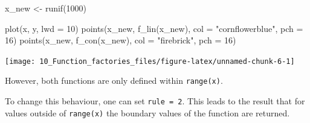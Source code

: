 \documentclass[
]{krantz}
\makeatletter
\newenvironment{Shaded}{\begin{snugshade}}{\end{snugshade}}
\newcommand{\CommentTok}[1]{\textcolor[rgb]{0.56,0.35,0.01}{\textit{#1}}}
\newcommand{\DataTypeTok}[1]{\textcolor[rgb]{0.13,0.29,0.53}{#1}}
\newcommand{\DecValTok}[1]{\textcolor[rgb]{0.00,0.00,0.81}{#1}}
\newcommand{\KeywordTok}[1]{\textcolor[rgb]{0.13,0.29,0.53}{\textbf{#1}}}
\newcommand{\NormalTok}[1]{#1}
\newcommand{\OperatorTok}[1]{\textcolor[rgb]{0.81,0.36,0.00}{\textbf{#1}}}
\newcommand{\StringTok}[1]{\textcolor[rgb]{0.31,0.60,0.02}{#1}}
\newenvironment{kframe}{%
\medskip{}
\setlength{\fboxsep}{.8em}
 \def\at@end@of@kframe{}%
 \ifinner\ifhmode%
  \def\at@end@of@kframe{\end{minipage}}%
  \begin{minipage}{\columnwidth}%
 \fi\fi%
 \def\FrameCommand##1{\hskip\@totalleftmargin \hskip-\fboxsep
 \colorbox{shadecolor}{##1}\hskip-\fboxsep
     \hskip-\linewidth \hskip-\@totalleftmargin \hskip\columnwidth}%
 \MakeFramed {\advance\hsize-\width
   \@totalleftmargin\z@ \linewidth\hsize
   \@setminipage}}%
 {\par\unskip\endMakeFramed%
 \at@end@of@kframe}
\renewenvironment{Shaded}{\begin{kframe}}{\end{kframe}}
\renewcommand{\KeywordTok} [1]{\textcolor[rgb]{0.00,0.44,0.13}{{#1}}}
\renewcommand{\DataTypeTok}[1]{\textcolor[rgb]{0.56,0.13,0.00}{{#1}}}
\renewcommand{\DecValTok}  [1]{\textcolor[rgb]{0.25,0.63,0.44}{{#1}}}
\renewcommand{\StringTok}  [1]{\textcolor[rgb]{0.25,0.44,0.63}{{#1}}}
\renewcommand{\CommentTok} [1]{\textcolor[rgb]{0.38,0.63,0.69}{{#1}}}
\renewcommand{\NormalTok}  [1]{{#1}}
\makeatother
\begin{document}
\begin{Shaded}
\begin{Highlighting}[]
\NormalTok{x_new <-}\StringTok{ }\KeywordTok{runif}\NormalTok{(}\DecValTok{1000}\NormalTok{)}

\KeywordTok{plot}\NormalTok{(x, y, }\DataTypeTok{lwd =} \DecValTok{10}\NormalTok{)}
\KeywordTok{points}\NormalTok{(x_new, }\KeywordTok{f_lin}\NormalTok{(x_new), }\DataTypeTok{col =} \StringTok{"cornflowerblue"}\NormalTok{, }\DataTypeTok{pch =} \DecValTok{16}\NormalTok{)}
\KeywordTok{points}\NormalTok{(x_new, }\KeywordTok{f_con}\NormalTok{(x_new), }\DataTypeTok{col =} \StringTok{"firebrick"}\NormalTok{, }\DataTypeTok{pch =} \DecValTok{16}\NormalTok{)}
\end{Highlighting}
\end{Shaded}

\begin{center}\texttt{[image: 10\_Function\_factories\_files/figure-latex/unnamed-chunk-6-1]} \end{center}

However, both functions are only defined within \texttt{range(x)}.

\begin{Shaded}
\end{Shaded}

To change this behaviour, one can set \texttt{rule\ =\ 2}. This leads to the result that for values outside of \texttt{range(x)} the boundary values of the function are returned.
\end{document}
